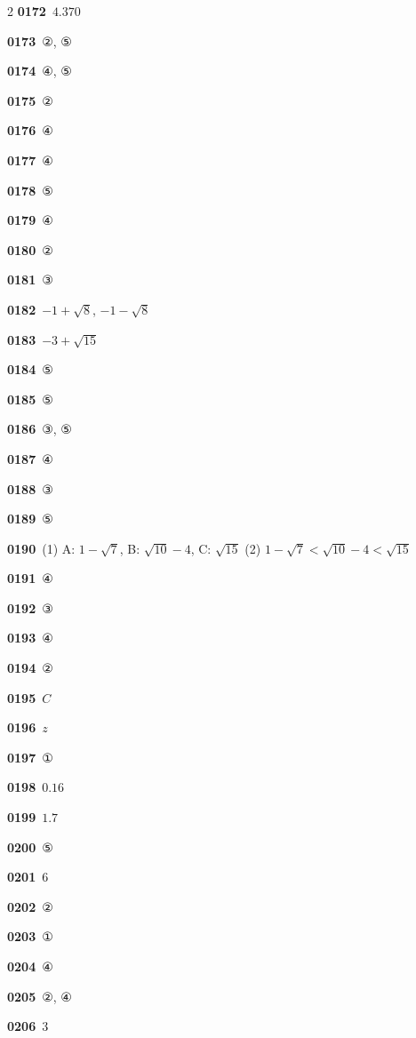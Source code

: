\documentclass[10pt,a4paper]{article}
\begin{document}
\begin{multicols}{2}
\noindent\textbf{0172}\ $4.370$\par
\noindent\textbf{0173}\ ②, ⑤\par
\noindent\textbf{0174}\ ④, ⑤\par
\noindent\textbf{0175}\ ②\par
\noindent\textbf{0176}\ ④\par
\noindent\textbf{0177}\ ④\par
\noindent\textbf{0178}\ ⑤\par
\noindent\textbf{0179}\ ④\par
\noindent\textbf{0180}\ ②\par
\noindent\textbf{0181}\ ③\par
\noindent\textbf{0182}\ $-1+\sqrt{8}$, $-1-\sqrt{8}$\par
\noindent\textbf{0183}\ $-3+\sqrt{15}$\par
\noindent\textbf{0184}\ ⑤\par
\noindent\textbf{0185}\ ⑤\par
\noindent\textbf{0186}\ ③, ⑤\par
\noindent\textbf{0187}\ ④\par
\noindent\textbf{0188}\ ③\par
\noindent\textbf{0189}\ ⑤\par
\noindent\textbf{0190}\ (1) A: $1-\sqrt{7}$, B: $\sqrt{10}-4$, C: $\sqrt{15}$ (2) $1-\sqrt{7}<\sqrt{10}-4<\sqrt{15}$\par
\noindent\textbf{0191}\ ④\par
\noindent\textbf{0192}\ ③\par
\noindent\textbf{0193}\ ④\par
\noindent\textbf{0194}\ ②\par
\noindent\textbf{0195}\ $C$\par
\noindent\textbf{0196}\ $z$\par
\noindent\textbf{0197}\ ①\par
\noindent\textbf{0198}\ $0.16$\par
\noindent\textbf{0199}\ $1.7$\par
\noindent\textbf{0200}\ ⑤\par
\noindent\textbf{0201}\ 6\par
\noindent\textbf{0202}\ ②\par
\noindent\textbf{0203}\ ①\par
\noindent\textbf{0204}\ ④\par
\noindent\textbf{0205}\ ②, ④\par
\noindent\textbf{0206}\ 3\par

\end{multicols}
\end{document}
